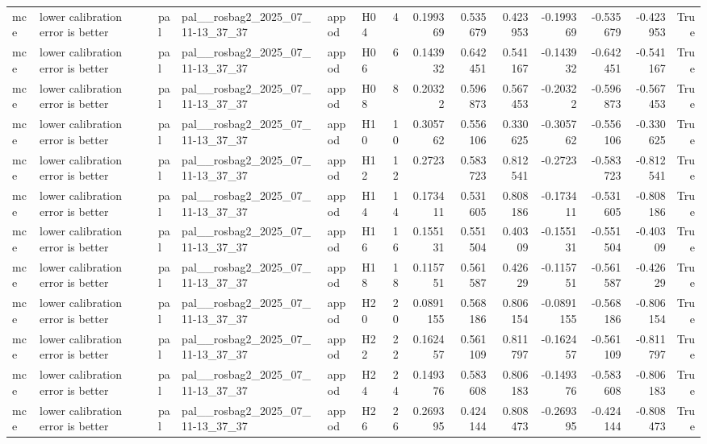 \begin{longtable}{llllllrrrrrrrr}
mce & lower calibration error is better & pal & pal\_\_rosbag2\_2025\_07\_11-13\_37\_37 & appod & H04 & 4 & 0.199369 & 0.535679 & 0.423953 & -0.199369 & -0.535679 & -0.423953 & True \\
mce & lower calibration error is better & pal & pal\_\_rosbag2\_2025\_07\_11-13\_37\_37 & appod & H06 & 6 & 0.143932 & 0.642451 & 0.541167 & -0.143932 & -0.642451 & -0.541167 & True \\
mce & lower calibration error is better & pal & pal\_\_rosbag2\_2025\_07\_11-13\_37\_37 & appod & H08 & 8 & 0.20322 & 0.596873 & 0.567453 & -0.20322 & -0.596873 & -0.567453 & True \\
mce & lower calibration error is better & pal & pal\_\_rosbag2\_2025\_07\_11-13\_37\_37 & appod & H10 & 10 & 0.305762 & 0.556106 & 0.330625 & -0.305762 & -0.556106 & -0.330625 & True \\
mce & lower calibration error is better & pal & pal\_\_rosbag2\_2025\_07\_11-13\_37\_37 & appod & H12 & 12 & 0.2723 & 0.583723 & 0.812541 & -0.2723 & -0.583723 & -0.812541 & True \\
mce & lower calibration error is better & pal & pal\_\_rosbag2\_2025\_07\_11-13\_37\_37 & appod & H14 & 14 & 0.173411 & 0.531605 & 0.808186 & -0.173411 & -0.531605 & -0.808186 & True \\
mce & lower calibration error is better & pal & pal\_\_rosbag2\_2025\_07\_11-13\_37\_37 & appod & H16 & 16 & 0.155131 & 0.551504 & 0.40309 & -0.155131 & -0.551504 & -0.40309 & True \\
mce & lower calibration error is better & pal & pal\_\_rosbag2\_2025\_07\_11-13\_37\_37 & appod & H18 & 18 & 0.115751 & 0.561587 & 0.42629 & -0.115751 & -0.561587 & -0.42629 & True \\
mce & lower calibration error is better & pal & pal\_\_rosbag2\_2025\_07\_11-13\_37\_37 & appod & H20 & 20 & 0.0891155 & 0.568186 & 0.806154 & -0.0891155 & -0.568186 & -0.806154 & True \\
mce & lower calibration error is better & pal & pal\_\_rosbag2\_2025\_07\_11-13\_37\_37 & appod & H22 & 22 & 0.162457 & 0.561109 & 0.811797 & -0.162457 & -0.561109 & -0.811797 & True \\
mce & lower calibration error is better & pal & pal\_\_rosbag2\_2025\_07\_11-13\_37\_37 & appod & H24 & 24 & 0.149376 & 0.583608 & 0.806183 & -0.149376 & -0.583608 & -0.806183 & True \\
mce & lower calibration error is better & pal & pal\_\_rosbag2\_2025\_07\_11-13\_37\_37 & appod & H26 & 26 & 0.269395 & 0.424144 & 0.808473 & -0.269395 & -0.424144 & -0.808473 & True \\

\end{longtable}
